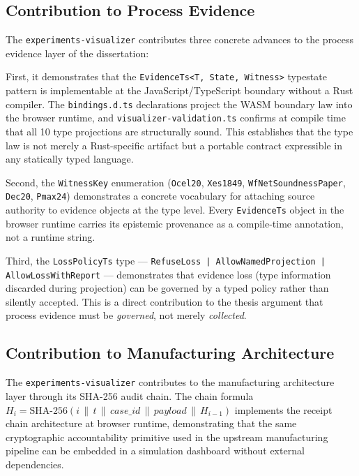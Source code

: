 \subsection{Contribution to Process Evidence}
\label{sec:experiments-visualizer-contribution-evidence}

The \texttt{experiments-visualizer} contributes three concrete advances to the process evidence
layer of the dissertation:

First, it demonstrates that the \texttt{EvidenceTs<T, State, Witness>} typestate pattern is
implementable at the JavaScript/TypeScript boundary without a Rust compiler. The
\texttt{bindings.d.ts} declarations project the WASM boundary law into the browser runtime,
and \texttt{visualizer-validation.ts} confirms at compile time that all 10 type projections
are structurally sound. This establishes that the type law is not merely a Rust-specific
artifact but a portable contract expressible in any statically typed language.

Second, the \texttt{WitnessKey} enumeration (\texttt{Ocel20}, \texttt{Xes1849},
\texttt{WfNetSoundnessPaper}, \texttt{Dec20}, \texttt{Pmax24}) demonstrates a concrete
vocabulary for attaching source authority to evidence objects at the type level. Every
\texttt{EvidenceTs} object in the browser runtime carries its epistemic provenance as a
compile-time annotation, not a runtime string.

Third, the \texttt{LossPolicyTs} type — \texttt{RefuseLoss | AllowNamedProjection |
AllowLossWithReport} — demonstrates that evidence loss (type information discarded during
projection) can be governed by a typed policy rather than silently accepted. This is a direct
contribution to the thesis argument that process evidence must be \emph{governed}, not merely
\emph{collected}.

\subsection{Contribution to Manufacturing Architecture}
\label{sec:experiments-visualizer-contribution-manufacturing}

The \texttt{experiments-visualizer} contributes to the manufacturing architecture layer through
its SHA-256 audit chain. The chain formula
$H_i = \mathrm{SHA\text{-}256}(i \,\|\, t \,\|\, \mathit{case\_id} \,\|\, \mathit{payload} \,\|\, H_{i-1})$
implements the receipt chain architecture at browser runtime, demonstrating that the same
cryptographic accountability primitive used in the upstream manufacturing pipeline can be
embedded in a simulation dashboard without external dependencies.

